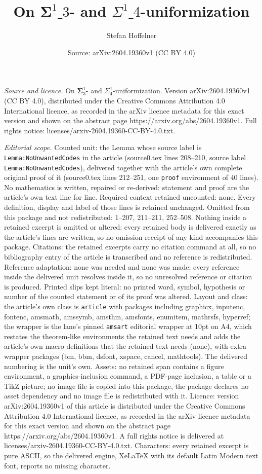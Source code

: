 \documentclass[10pt,a4paper]{amsart}
\title[On $\boldsymbol{\Sigma}^1\_3$- and $\Sigma^1\_4$-uniformizatio]{On $\boldsymbol{\Sigma}^1\_3$- and $\Sigma^1\_4$-uniformization}
\author{Stefan Hoffelner}
\date{Source: arXiv:2604.19360v1 (CC BY 4.0)}
\begin{document}
\maketitle

\noindent\emph{Source and licence.} On $\boldsymbol{\Sigma}^1_3$- and $\Sigma^1_4$-uniformization. Version arXiv:2604.19360v1 (CC BY 4.0), distributed under the Creative Commons Attribution 4.0 International licence, as recorded in the arXiv licence metadata for this exact version and shown on the abstract page https://arxiv.org/abs/2604.19360v1. Full rights notice: licenses/arxiv-2604.19360-CC-BY-4.0.txt.\par\smallskip

\noindent\textit{Editorial scope.} Counted unit: the Lemma whose source label is \texttt{Lemma:NoUnwantedCodes} in the article (source0.tex lines 208--210, source label \texttt{Lemma:NoUnwantedCodes}), delivered together with the article's own complete original proof of it (source0.tex lines 212--251, one \texttt{proof} environment of 40 lines). No mathematics is written, repaired or re-derived: statement and proof are the article's own text line for line. Required context retained uncounted: none. Every definition, display and label of those lines is retained unchanged. Omitted from this package and not redistributed: 1--207, 211--211, 252--508. Nothing inside a retained excerpt is omitted or altered: every retained body is delivered exactly as the article's lines are written, so no omission receipt of any kind accompanies this package. Citations: the retained excerpts carry no citation command at all, so no bibliography entry of the article is transcribed and no reference is redistributed. Reference adaptation: none was needed and none was made; every reference inside the delivered unit resolves inside it, so no unresolved reference or citation is produced. Printed slips kept literal: no printed word, symbol, hypothesis or number of the counted statement or of its proof was altered. Layout and class: the article's own class is \texttt{article} with packages including graphicx, inputenc, fontenc, amsmath, amssymb, amsthm, amsfonts, enumitem, mathrsfs, hyperref; the wrapper is the lane's pinned \texttt{amsart} editorial wrapper at 10pt on A4, which restates the theorem-like environments the retained text needs and adds the article's own macro definitions that the retained text needs (none), with extra wrapper packages (bm, bbm, dsfont, xspace, cancel, mathtools). The delivered numbering is the unit's own. Assets: no retained span contains a figure environment, a graphics-inclusion command, a PDF-page inclusion, a table or a TikZ picture; no image file is copied into this package, the package declares no asset dependency and no image file is redistributed with it. Licence: version arXiv:2604.19360v1 of this article is distributed under the Creative Commons Attribution 4.0 International licence, as recorded in the arXiv licence metadata for this exact version and shown on the abstract page https://arxiv.org/abs/2604.19360v1. A full rights notice is delivered at licenses/arxiv-2604.19360-CC-BY-4.0.txt. Characters: every retained excerpt is pure ASCII, so the delivered engine, XeLaTeX with its default Latin Modern text font, reports no missing character.
\end{document}
